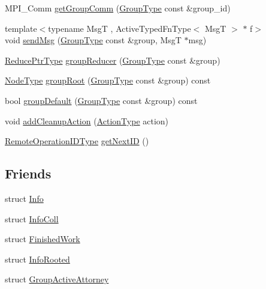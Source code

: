 \begin{DoxyCompactItemize}
\item 
M\+P\+I\+\_\+\+Comm \hyperlink{structvt_1_1group_1_1_group_manager_aeb28b3e11f8901329a9a0c3bddd926f6}{get\+Group\+Comm} (\hyperlink{namespacevt_a27b5e4411c9b6140c49100e050e2f743}{Group\+Type} const \&group\+\_\+id)
\item 
{\footnotesize template$<$typename MsgT , Active\+Typed\+Fn\+Type$<$ Msg\+T $>$ $\ast$ f$>$ }\\void \hyperlink{structvt_1_1group_1_1_group_manager_ad7eca93f1423603999a05fd9c6df8725}{send\+Msg} (\hyperlink{namespacevt_a27b5e4411c9b6140c49100e050e2f743}{Group\+Type} const \&group, MsgT $\ast$msg)
\item 
\hyperlink{structvt_1_1group_1_1_group_manager_a0c646983506b624ad93ceb127df9e811}{Reduce\+Ptr\+Type} \hyperlink{structvt_1_1group_1_1_group_manager_ab6ee94facc8da1e80e52cf0eda26dc5e}{group\+Reducer} (\hyperlink{namespacevt_a27b5e4411c9b6140c49100e050e2f743}{Group\+Type} const \&group)
\item 
\hyperlink{namespacevt_a866da9d0efc19c0a1ce79e9e492f47e2}{Node\+Type} \hyperlink{structvt_1_1group_1_1_group_manager_ae813f2b894016f05569d7d06aae55315}{group\+Root} (\hyperlink{namespacevt_a27b5e4411c9b6140c49100e050e2f743}{Group\+Type} const \&group) const
\item 
bool \hyperlink{structvt_1_1group_1_1_group_manager_ad9ae779b8223ad458edd62ae5e8a9003}{group\+Default} (\hyperlink{namespacevt_a27b5e4411c9b6140c49100e050e2f743}{Group\+Type} const \&group) const
\item 
void \hyperlink{structvt_1_1group_1_1_group_manager_a79edddb814a77d2ff45fea14291e95df}{add\+Cleanup\+Action} (\hyperlink{namespacevt_ae0a5a7b18cc99d7b732cb4d44f46b0f3}{Action\+Type} action)
\item 
\hyperlink{namespacevt_1_1group_a73f2624ddeb535b39a08b6524f26b244}{Remote\+Operation\+I\+D\+Type} \hyperlink{structvt_1_1group_1_1_group_manager_ac8a02606998928c4d688386cddf0d3e0}{get\+Next\+ID} ()
\end{DoxyCompactItemize}
\subsection*{Friends}
\begin{DoxyCompactItemize}
\item 
struct \hyperlink{structvt_1_1group_1_1_group_manager_af0a264c27d0d08af4b617d2e4675fda7}{Info}
\item 
struct \hyperlink{structvt_1_1group_1_1_group_manager_a977ca475df628d7e164bae4a7a97c001}{Info\+Coll}
\item 
struct \hyperlink{structvt_1_1group_1_1_group_manager_ae1817e369e2c7539a02b4eeb0e5cdb83}{Finished\+Work}
\item 
struct \hyperlink{structvt_1_1group_1_1_group_manager_a612933a09f56f2382ccb3e70a423d418}{Info\+Rooted}
\item 
struct \hyperlink{structvt_1_1group_1_1_group_manager_a3b688c56f16100f140edbbb49b9de739}{Group\+Active\+Attorney}
\end{DoxyCompactItemize}
